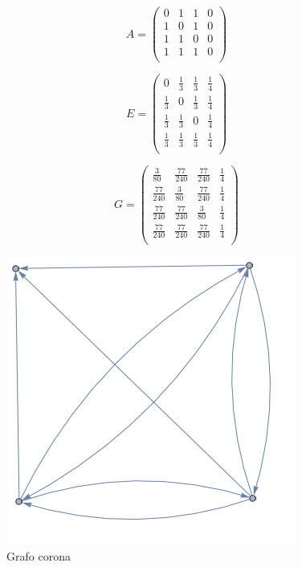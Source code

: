 \begin{equation}
    A =
    \begin{pmatrix}
        0 & 1 & 1 & 0 \\
        1 & 0 & 1 & 0 \\
        1 & 1 & 0 & 0 \\
        1 & 1 & 1 & 0 \\
    \end{pmatrix}
\end{equation}

\begin{equation}
    E =
    \begin{pmatrix}
        0 & \frac{1}{3} & \frac{1}{3} & \frac{1}{4} \\
        \frac{1}{3} & 0 & \frac{1}{3} & \frac{1}{4} \\
        \frac{1}{3} & \frac{1}{3} & 0 & \frac{1}{4} \\
        \frac{1}{3} & \frac{1}{3} & \frac{1}{3} & \frac{1}{4} \\
    \end{pmatrix}
\end{equation}

\begin{equation}
    G =
    \begin{pmatrix}
        \frac{3}{80} & \frac{77}{240} & \frac{77}{240} & \frac{1}{4} \\
        \frac{77}{240} & \frac{3}{80} & \frac{77}{240} & \frac{1}{4} \\
        \frac{77}{240} & \frac{77}{240} & \frac{3}{80} & \frac{1}{4} \\
        \frac{77}{240} & \frac{77}{240} & \frac{77}{240} & \frac{1}{4} \\
    \end{pmatrix}
\end{equation}

\begin{figure}[H]
    \centering
    \includegraphics[width=0.5\linewidth]{img/crown.png}
    \caption[Grafo corona]{Grafo corona}
    \label{fig:crown}
\end{figure}

